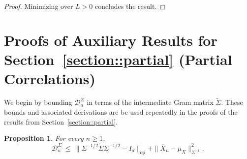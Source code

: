 \documentclass[11pt]{article}
\newtheorem{proposition}[theorem]{Proposition}
\begin{document}
\begin{appendices}
\begin{proof}
Minimizing over $L > 0$ concludes the result.
\end{proof}






\section{Proofs of Auxiliary Results for Section~\ref{section::partial} (Partial Correlations)}
\label{appendix:auxiliary.partial}
We begin by bounding $\mathcal{D}_n^{\Sigma}$ in terms of the intermediate Gram matrix $\widetilde{\Sigma}$. These bounds and associated derivations are be used repeatedly in the proofs of the results from Section~\ref{section::partial}.

\begin{proposition}\label{prop:bounding-D-sigma}
For every $n\ge1$,
\[
\mathcal{D}_n^{\Sigma} ~\le~ \|\Sigma^{-1/2}\widetilde{\Sigma}\Sigma^{-1/2} - I_d\|_{\mathrm{op}} + \|\overline{X}_n - \mu_X\|_{\Sigma^{-1}}^2.
\]
\end{proposition}


\end{appendices}
\end{document}
